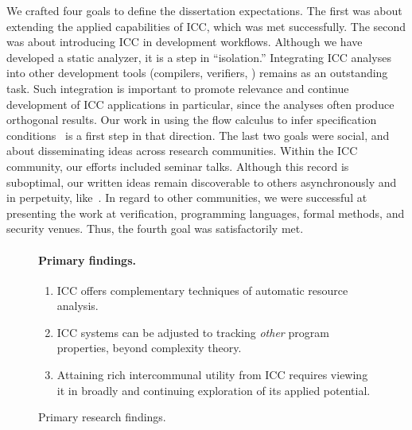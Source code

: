 We crafted four goals to define the dissertation expectations.
The first was about extending the applied capabilities of ICC, which was met successfully.
The second was about introducing ICC in development workflows.
Although we have developed a static analyzer, it is a step in \enquote{isolation.}
Integrating ICC analyses into other development tools (compilers, verifiers, \etc) remains as an outstanding task.
Such integration is important to promote relevance and continue development of ICC {applications}
in particular, since the analyses often produce orthogonal results.
Our work in using the flow calculus to infer specification conditions~\cite{rusch2025} is a first step in that direction.
The last two goals were social, and about disseminating ideas across research communities.
Within the ICC community, our efforts included seminar talks.
Although this record is suboptimal, our written ideas remain discoverable to others asynchronously and in perpetuity, like~\cite{moyen2017}.
In regard to other communities, we were successful at presenting the work at verification, programming languages, formal methods, and security venues.
Thus, the fourth goal was satisfactorily met.

\begin{figure}[h]
    \begin{mdframed} %
        \paragraph*{Primary findings.}
        \begin{enumerate}[wide, labelwidth=!, labelindent=0pt]
            \item ICC offers complementary techniques of automatic resource analysis.
            \item ICC systems can be adjusted to tracking \emph{other} program properties, beyond complexity theory.
            \item Attaining rich intercommunal utility from ICC requires viewing it in broadly and continuing exploration of its applied potential.
        \end{enumerate}
    \end{mdframed}
    \caption[Primary research findings summarized]{Primary research findings.}
    \label{fig:findings}
\end{figure}

